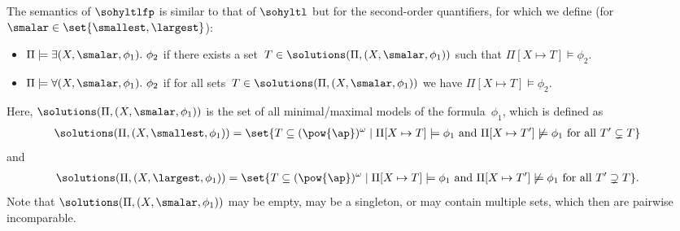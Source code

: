 The semantics of $\sohyltlfp$ is similar to that of $\sohyltl$ but for the second-order quantifiers, for which we define (for $\smalar \in \set{\smallest,\largest}$):
\begin{itemize}
    \item $\Pi \models \exists (X,\smalar,\phi_1).\ \phi_2$ if there exists a set~$T \in \solutions(\Pi, (X,\smalar,\phi_1))$ such that $\Pi[X\mapsto T] \models \phi_2$.
    \item $\Pi \models \forall (X,\smalar,\phi_1).\ \phi_2$ if for all sets~$T \in \solutions(\Pi, (X,\smalar,\phi_1))$ we have $\Pi[X\mapsto T] \models \phi_2$.
\end{itemize}
Here, $\solutions(\Pi, (X,\smalar,\phi_1))$ is the set of all minimal/maximal models of the formula~$\phi_1$, which is defined as 
\begin{align*}
    {}&{}\!\!\!\solutions(\Pi, (X,\smallest,\phi_1))  = \set{T \subseteq (\pow{\ap})^\omega \mid \Pi[X\mapsto T] \models \phi_1\text{ and } 
    \Pi[X\mapsto T'] \not\models \phi_1 \text{ for all } T' \subsetneq T }
\end{align*}
and
\begin{align*}
    {}&{}\!\!\!\solutions(\Pi, (X,\largest,\phi_1))  = \set{T \subseteq (\pow{\ap})^\omega \mid \Pi[X\mapsto T] \models \phi_1 \text{ and }
     \Pi[X\mapsto T'] \not\models \phi_1 \text{ for all } T' \supsetneq T}.
\end{align*}
Note that $\solutions(\Pi, (X,\smalar,\phi_1))$ may be empty, may be a singleton, or may contain multiple sets, which then are pairwise incomparable.

